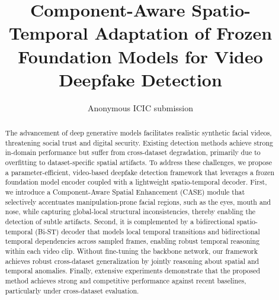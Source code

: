 \documentclass[runningheads]{llncs}
\begin{document}
%
\title{Component-Aware Spatio-Temporal Adaptation of Frozen Foundation Models for Video Deepfake Detection}
%
%
\author{Anonymous ICIC submission}
\institute{~}

%
%
\maketitle              %
%


\begin{abstract}
The advancement of deep generative models facilitates realistic synthetic facial videos, threatening social trust and digital security. Existing detection methods achieve strong in-domain performance but suffer from cross-dataset degradation, primarily due to overfitting to dataset-specific spatial artifacts. To address these challenges, we propose a parameter-efficient, video-based deepfake detection framework that leverages a frozen foundation model encoder coupled with a lightweight spatio-temporal decoder. First, we introduce a Component-Aware Spatial Enhancement (CASE) module that selectively accentuates manipulation-prone facial regions, such as the eyes, mouth and nose, while capturing global-local structural inconsistencies, thereby enabling the detection of subtle artifacts. Second, it is complemented by a bidirectional spatio-temporal (Bi-ST) decoder that models local temporal transitions and bidirectional temporal dependencies across sampled frames, enabling robust temporal reasoning within each video clip. Without fine-tuning the backbone network, our framework achieves robust cross-dataset generalization by jointly reasoning about spatial and temporal anomalies. Finally, extensive experiments demonstrate that the proposed method achieves strong and competitive performance against recent baselines, particularly under cross-dataset evaluation.

\end{abstract}
%
%
%
\end{document}

